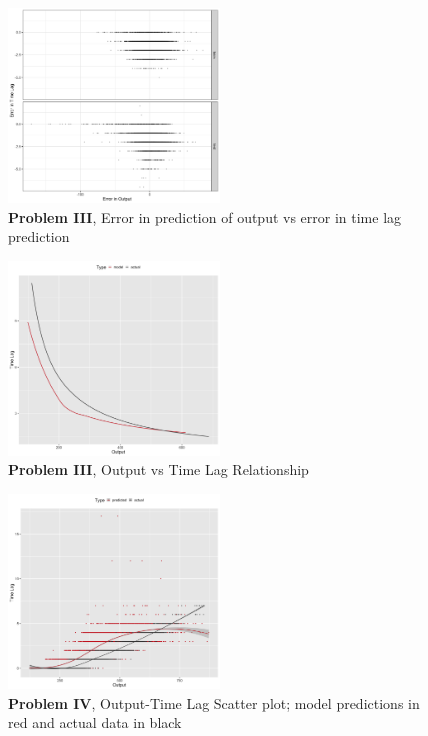 \documentclass[twoside]{article}
\begin{document}
\begin{figure}[h]
\vspace{.3in}
\centerline{\includegraphics[width=0.5\textwidth]{figures/exp3_scatter_errors_test.png}}
\vspace{.3in}
\caption{\textbf{Problem III}, Error in prediction of output vs error in time lag prediction}
\end{figure}

\begin{figure}[h]
\vspace{.3in}
\centerline{\includegraphics[width=0.5\textwidth]{figures/exp3_predictive_curves.png}}
\vspace{.3in}
\caption{\textbf{Problem III}, Output vs Time Lag Relationship}
\end{figure}


\begin{figure}[h]
\vspace{.3in}
\centerline{\includegraphics[width=0.5\textwidth]{figures/exp4_scatter_v_tl.png}}
\vspace{.3in}
\caption{\textbf{Problem IV}, Output-Time Lag Scatter plot; model predictions in red and actual data in black}
\end{figure}
\end{document}
